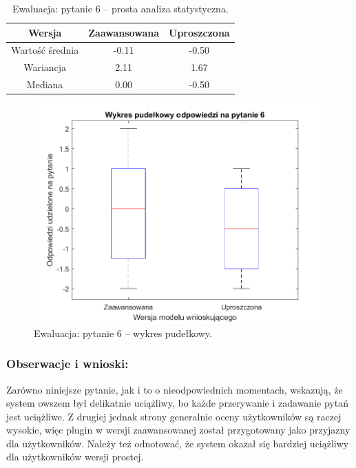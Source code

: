 	\begin{table}[!h]
		\caption{Ewaluacja: pytanie 6 -- prosta analiza statystyczna.}
		\centering
		\begin{tabular}{|c|c|c|}
			\hline
			Wersja          & Zaawansowana & Uproszczona \\ \hline
			Wartość średnia & -0.11        & -0.50       \\ \hline
			Wariancja       &  2.11        &  1.67       \\ \hline
			Mediana         &  0.00        & -0.50       \\ \hline
		\end{tabular}
	\end{table}
	\clearpage
	
	\begin{figure}[H]
		\centering
		\includegraphics[scale=0.8]{rozdzial5/Ewaluacja6.png}
		\caption{Ewaluacja: pytanie 6 -- wykres pudełkowy.}
	\end{figure}
	
	\subsubsection{Obserwacje i wnioski:}
	
	Zarówno niniejsze pytanie, jak i to o nieodpowiednich momentach, wskazują, że system owszem był delikatnie uciążliwy, bo każde przerywanie i zadawanie pytań jest uciążliwe. Z drugiej jednak strony generalnie oceny użytkowników są raczej wysokie, więc plugin w wersji zaawansowanej został przygotowany jako przyjazny dla użytkowników. Należy też odnotować, że system okazał się bardziej uciążliwy dla użytkowników wersji prostej.
	
